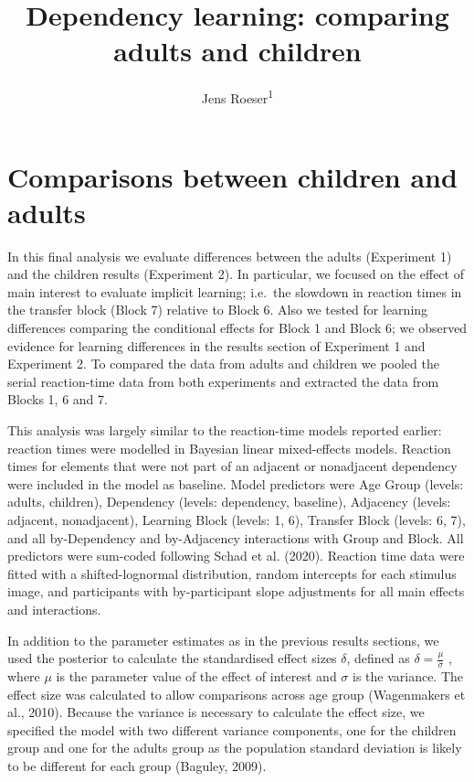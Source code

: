 \documentclass[
  english,
  man,floatsintext]{apa7}
\author{Jens Roeser\textsuperscript{1}}
\affiliation{
\vspace{0.5cm}
\textsuperscript{1} Department of Psychology, Nottingham Trent University, United Kingdom}
\title{Dependency learning: comparing adults and children}
\date{}
\begin{document}
\maketitle

\hypertarget{comparisons-between-children-and-adults}{%
\section{Comparisons between children and adults}\label{comparisons-between-children-and-adults}}

In this final analysis we evaluate differences between the adults (Experiment 1) and the children results (Experiment 2). In particular, we focused on the effect of main interest to evaluate implicit learning; i.e.~the slowdown in reaction times in the transfer block (Block 7) relative to Block 6. Also we tested for learning differences comparing the conditional effects for Block 1 and Block 6; we observed evidence for learning differences in the results section of Experiment 1 and Experiment 2. To compared the data from adults and children we pooled the serial reaction-time data from both experiments and extracted the data from Blocks 1, 6 and 7.

This analysis was largely similar to the reaction-time models reported earlier: reaction times were modelled in Bayesian linear mixed-effects models. Reaction times for elements that were not part of an adjacent or nonadjacent dependency were included in the model as baseline. Model predictors were Age Group (levels: adults, children), Dependency (levels: dependency, baseline), Adjacency (levels: adjacent, nonadjacent), Learning Block (levels: 1, 6), Transfer Block (levels: 6, 7), and all by-Dependency and by-Adjacency interactions with Group and Block. All predictors were sum-coded following Schad et al. (2020). Reaction time data were ﬁtted with a shifted-lognormal distribution, random intercepts for each stimulus image, and participants with by-participant slope adjustments for all main effects and interactions.

In addition to the parameter estimates as in the previous results sections, we used the posterior to calculate the standardised effect sizes \(\delta\), defined as \(\delta = \frac{\mu}{\sigma}\) , where \(\mu\) is the parameter value of the effect of interest and \(\sigma\) is the variance. The effect size was calculated to allow comparisons across age group (Wagenmakers et al., 2010). Because the variance is necessary to calculate the effect size, we specified the model with two different variance components, one for the children group and one for the adults group as the population standard deviation is likely to be different for each group (Baguley, 2009).
\end{document}
